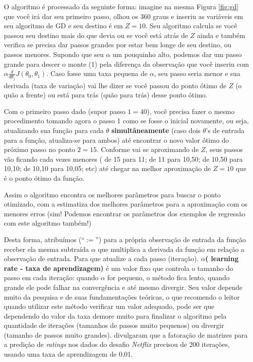 \documentclass[
]{book}
\begin{document}
O algoritmo é processado da seguinte forma: imagine na mesma Figura \ref{fig:gd} que você irá dar seu primeiro passo, olhou os 360 graus e inseriu as variáveis em seu algoritmo de GD e seu destino é em \(Z=10\). Seu algoritmo calcula se você passou seu destino mais do que devia ou se você está atrás de \(Z\) ainda e também verifica se precisa dar passos grandes por estar bem longe de seu destino, ou passos menores. Supondo que seu \(\alpha\) um pouquinho alto, podemos dar um passo grande para descer o monte (1) pela diferença da observação que você inseriu com \(\alpha \frac{d}{d \theta_j}J(\theta_0,\theta_1)\). Caso fosse uma taxa pequena de \(\alpha\), seu passo seria menor e sua derivada (taxa de variação) vai lhe dizer se você passou do ponto ótimo de \(Z\) (o quão a frente) ou está para trás (quão para trás) desse ponto ótimo.

Com o primeiro passo dado (supor passo \(1 = 40\)), você precisa fazer o mesmo procedimento tomando agora o passo 1 como se fosse o inicial novamente, ou seja, atualizando sua função para cada \(\theta\) \textbf{simultâneamente} (caso dois \(\theta\)'s de entrada para a função, atualiza-se para ambos) até encontrar o novo valor ótimo do próximo passo no ponto \(2=15\). Conforme vai se aproximando de \(Z\), seus passos vão ficando cada vezes menores ( de 15 para 11; de 11 para 10,50; de 10,50 para 10,10; de 10,10 para 10,05; etc) até chegar na melhor aproximação de \(Z=10\) que é o ponto ótimo da função.

Assim o algoritmo encontra os melhores parâmetros para buscar o ponto otimizado, com a estimatiza dos melhores parâmetros para a aproximação com os menores erros (sim! Podemos encontrar os parâmetros dos exemplos de regressão com este algoritmo também!)

Desta forma, atribuímos (``\(:=\)'') para a própria observação de entrada da função receber ela mesma subtraída \(\alpha\) que multiplica a derivada da função em relação a observação de entrada. Para que atualize a cada passo (iteração). \textbf{\(\alpha\)( learning rate - taxa de aprendizagem)} é um valor fixo que controla o tamanho do passo em cada iteração: quando \(\alpha\) for pequeno, o método fica lento, quando grande ele pode falhar na convergência e até mesmo divergir. Seu valor depende muito da pesquisa e de suas fundamentações teóricas, o que recomendo o leitor quando utilizar este método verificar um valor adequado, pode ser que dependendo do valor da taxa demore muito para finalizar o algoritmo pela quantidade de iterações (tamanhos de passos muito pequenos) ou divergir (tamanho de passos muito grandes). \citet{rendle2008online} divulgaram que a fatoração de matrizes para a predição de \emph{ratings} nos dados do desafio \emph{Netflix} precisou de 200 iterações, usando uma taxa de aprendizagem de 0,01.
\end{document}

